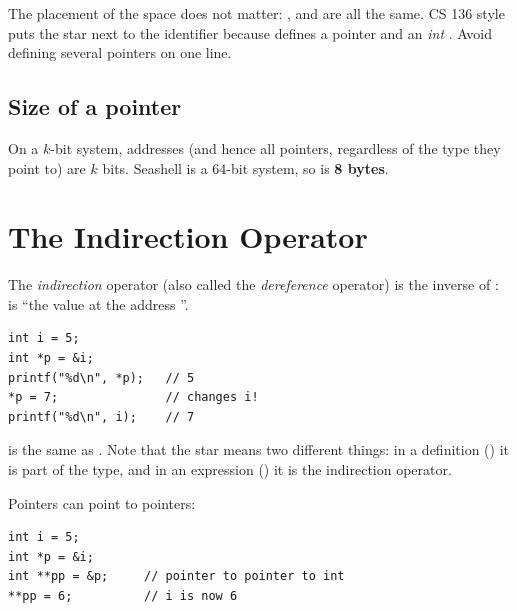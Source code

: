 \begin{aside}
The placement of the space does not matter: ,  and  are
all the same. CS 136 style puts the star next to the identifier because
 defines a pointer  and an \emph{int} . Avoid defining several
pointers on one line.
\end{aside}

\subsection{Size of a pointer}

On a $k$-bit system, addresses (and hence all pointers, regardless of the type they point to)
are $k$ bits. Seashell is a 64-bit system, so  is \textbf{8 bytes}.

\section{The Indirection Operator}

The \emph{indirection} operator \code{*} (also called the \emph{dereference} operator) is the
inverse of \code{\&}:  is ``the value at the address ''.
\begin{lstlisting}[style=c]
int i = 5;
int *p = &i;
printf("%d\n", *p);   // 5
*p = 7;               // changes i!
printf("%d\n", i);    // 7
\end{lstlisting}
 is the same as . Note that the star means two different things: in a
definition () it is part of the type, and in an expression () it is the
indirection operator.

Pointers can point to pointers:
\begin{lstlisting}[style=c]
int i = 5;
int *p = &i;
int **pp = &p;     // pointer to pointer to int
**pp = 6;          // i is now 6
\end{lstlisting}

\begin{center}
\end{center}

